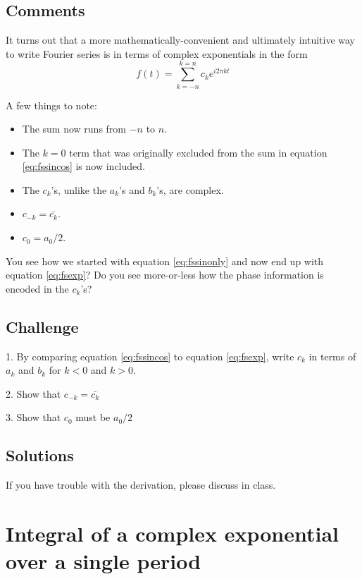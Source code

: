 \subsection*{Comments}
It turns out that a more mathematically-convenient and ultimately intuitive way to write Fourier series is in terms of complex exponentials in the form
\begin{equation}
    \label{eq:fsexp}
    f(t) = \sum_{k=-n}^{k=n} c_k e^{i 2 \pi k t}
\end{equation}

A few things to note:
\begin{itemize}
    \item The sum now runs from $-n$ to $n$.
    \item The $k=0$ term that was originally excluded from the sum in equation \ref{eq:fssincos} is now included.
    \item The $c_k$'s, unlike the $a_k$'s and $b_k$'s, are complex.
    \item $c_{-k} = \bar{c_k}$.
    \item $c_0 = a_0/2$.
\end{itemize}

You see how we started with equation \ref{eq:fssinonly} and now end up with equation \ref{eq:fsexp}? Do you see more-or-less how the phase information is encoded in the $c_k$'s?

\subsection*{Challenge}
1. By comparing equation \ref{eq:fssincos} to equation \ref{eq:fsexp}, write $c_k$ in terms of $a_k$ and $b_k$ for $k<0$ and $k>0$.

2. Show that $c_{-k} = \bar{c_k}$

3. Show that $c_0$ must be $a_0/2$

\subsection*{Solutions}
If you have trouble with the derivation, please discuss in class.




\newpage
\section{Integral of a complex exponential over a single period}

